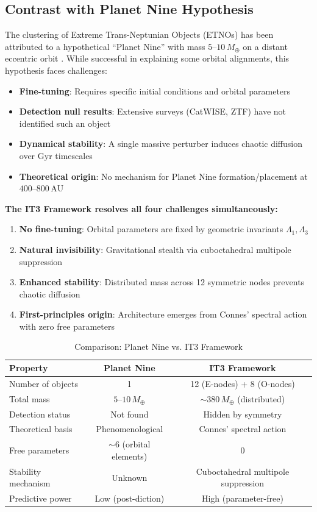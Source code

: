 \documentclass[11pt,a4paper]{article}
\theoremstyle{remark}
\newcommand{\AU}{\,\mathrm{AU}}
\newcommand{\Mearth}{\,M_\oplus}
\newcommand{\Lone}{\Lambda_1}
\newcommand{\Lthree}{\Lambda_3}
\begin{document}
\subsection{Contrast with Planet Nine Hypothesis}

The clustering of Extreme Trans-Neptunian Objects (ETNOs) has been attributed to a hypothetical ``Planet Nine'' with mass $5$--$10\Mearth$ on a distant eccentric orbit \cite{batygin2016}. While successful in explaining some orbital alignments, this hypothesis faces challenges:

\begin{itemize}
    \item[(i)] \textbf{Fine-tuning}: Requires specific initial conditions and orbital parameters
    \item[(ii)] \textbf{Detection null results}: Extensive surveys (CatWISE, ZTF) have not identified such an object
    \item[(iii)] \textbf{Dynamical stability}: A single massive perturber induces chaotic diffusion over Gyr timescales
    \item[(iv)] \textbf{Theoretical origin}: No mechanism for Planet Nine formation/placement at $400$--$800\AU$
\end{itemize}

\textbf{The IT3 Framework resolves all four challenges simultaneously:}
\begin{enumerate}
    \item \textbf{No fine-tuning}: Orbital parameters are fixed by geometric invariants $\Lone, \Lthree$
    \item \textbf{Natural invisibility}: Gravitational stealth via cuboctahedral multipole suppression
    \item \textbf{Enhanced stability}: Distributed mass across 12 symmetric nodes prevents chaotic diffusion
    \item \textbf{First-principles origin}: Architecture emerges from Connes' spectral action with zero free parameters
\end{enumerate}

\begin{table}[htbp]
\centering
\caption{Comparison: Planet Nine vs. IT3 Framework}
\label{tab:comparison}
\begin{tabular}{lcc}
\toprule
\textbf{Property} & \textbf{Planet Nine} & \textbf{IT3 Framework} \\
\midrule
Number of objects & 1 & 12 (E-nodes) + 8 (O-nodes) \\
Total mass & $5$--$10\Mearth$ & $\sim 380\Mearth$ (distributed) \\
Detection status & Not found & Hidden by symmetry \\
Theoretical basis & Phenomenological & Connes' spectral action \\
Free parameters & $\sim 6$ (orbital elements) & $0$ \\
Stability mechanism & Unknown & Cuboctahedral multipole suppression \\
Predictive power & Low (post-diction) & High (parameter-free) \\
\bottomrule
\end{tabular}
\end{table}
\end{document}
